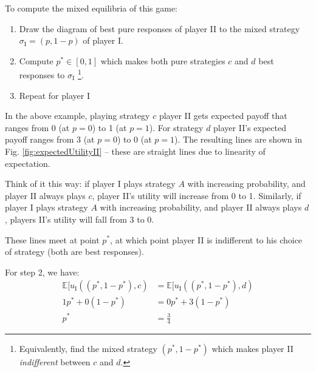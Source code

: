 To compute the mixed equilibria of this game:

\begin{enumerate}
	\itemsep0em
	\item Draw the diagram of best pure responses of player II to the mixed
		strategy $\sigma_{\text{I}} = (p, 1-p)$ of player I.
	\item Compute $p^* \in [0,1]$ which makes both pure strategies $c$ and $d$
		best responses to $\sigma_{\text{I}}$ \footnote{Equivalently, find the
		mixed strategy $(p^*, 1-p^*)$ which makes player II
		\textit{indifferent} between $c$ and $d$.}.
	\item Repeat for player I
\end{enumerate}

In the above example, playing strategy $c$ player II gets expected payoff that
ranges from 0 (at $p=0$) to 1 (at $p=1$). For strategy $d$ player II's expected
payoff ranges from 3 (at $p=0$) to 0 (at $p=1$).  The resulting lines are shown
in Fig. \ref{fig:expectedUtilityII} -- these are straight lines due to
linearity of expectation.

\begin{center}
\end{center}

Think of it this way: if player I plays strategy $A$ with increasing
probability, and player II always plays $c$, player II's utility will increase
from 0 to 1. Similarly, if player I plays strategy $A$ with increasing
probability, and player II always plays $d$, players II's utility will fall
from 3 to 0.

These lines meet at point $p^*$, at which point player II is indifferent to his
choice of strategy (both are best responses).

For step 2, we have:
\begin{equation*}
	\begin{split}
		\mathbb{E}[u_\text{I}((p^*, 1-p^*), c) & =
		\mathbb{E}[u_\text{I}((p^*, 1-p^*), d) \\
		1 p^* + 0 (1 - p^*) & = 0 p^* + 3 (1-p^*) \\
		p^* & = \frac{3}{4}
	\end{split}
\end{equation*}

